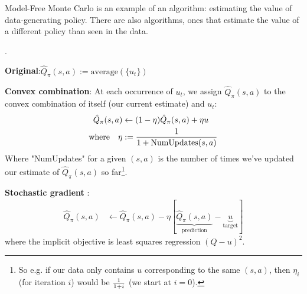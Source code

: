 \documentclass[11pt]{article}
\newcommand\myspace[1][]{\vspace{#1\bigskipamount}\Needspace{10\baselineskip}}
\begin{document}
Model-Free Monte Carlo is an example of an  algorithm: estimating the value of data-generating policy. There are also  algorithms, ones that estimate the value of a different policy than seen in the data.

\myspace
{} . 
\begin{compactitem}
	\item \textbf{Original}:$ \hat Q_{\pi}(s, a) := \text{average}(\{u_t\})$
	
	\item \textbf{Convex combination}: At each occurrence of $u_t$, we assign $\hat Q_{\pi}(s, a)$ to the convex combination of itself (our current estimate) and $u_t$:
	\begin{align}
		\hat Q_{\pi}(s, a)
			&\leftarrow (1 - \eta) \hat Q_{\pi}(s, a) + \eta u \\
		\text{where}\quad 
		\eta
			&:= \frac{1}{1 + \text{NumUpdates}(s, a)} 
	\end{align}
	Where "NumUpdates" for a given $(s, a)$ is the number of times we've updated our estimate of $\hat Q_{\pi}(s, a)$ so far\footnote{So e.g. if our data only contains $u$ corresponding to the same $(s, a)$, then $\eta_i$ (for iteration $i$) would be $\frac{1}{1 + i}$ (we start at $i=0$).}.
	
	\item \textbf{Stochastic gradient} :
	\begin{align}
		\hat Q_{\pi}(s, a) 
			&\leftarrow \hat Q_{\pi}(s, a) - \eta \left[
				\underbrace{ \hat Q_{\pi}(s, a) }_\text{prediction}  - 
				\underbrace{ u }_\text{target}
			\right]
	\end{align}
	where the implicit objective is least squares regression $(Q - u)^2$. 
\end{compactitem}
\end{document}
